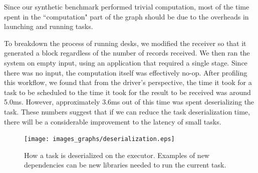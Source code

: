 %
%

Since our synthetic benchmark performed trivial computation, most of the time spent in the ``computation" part of the graph should be due to the overheads in launching and running tasks. 

To breakdown the process of running desks, we modified the receiver so that it generated a block regardless of the number of records received. We then ran the system on empty input, using an application that required a single stage. Since there was no input, the computation itself was effectively no-op. After profiling this workflow, we found that from the driver's perspective, the time it took for a task to be scheduled to the time it took for the result to be received was around 5.0ms. However, approximately 3.6ms out of this time was spent deserializing the task. These numbers suggest that if we can reduce the task deserialization time, there will be a considerable improvement to the latency of small tasks.

\begin{figure}[t!]
 \begin{center}
   \texttt{[image: images\_graphs/deserialization.eps]}
 \end{center}
 \caption{How a task is deserialized on the executor. Examples of new dependencies can be new libraries needed to run the current task.}
 \label{fig:deserialization}
\end{figure}


